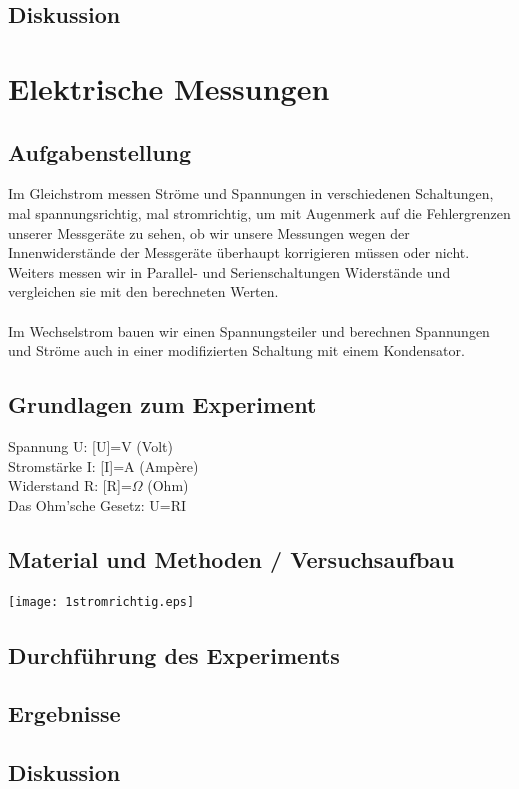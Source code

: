 \documentclass{article}
\begin{document}
\subsection{Diskussion}

\section{Elektrische Messungen}
\subsection{Aufgabenstellung}
Im Gleichstrom messen Ströme und Spannungen in verschiedenen Schaltungen, mal spannungsrichtig, mal stromrichtig, um mit Augenmerk auf die Fehlergrenzen unserer Messgeräte zu sehen, ob wir unsere Messungen wegen der Innenwiderstände der Messgeräte überhaupt korrigieren müssen oder nicht.\\
Weiters messen wir in Parallel- und Serienschaltungen Widerstände und vergleichen sie mit den berechneten Werten.\\
\\
Im Wechselstrom bauen wir einen Spannungsteiler und berechnen Spannungen und Ströme auch in einer modifizierten Schaltung mit einem Kondensator.

\subsection{Grundlagen zum Experiment}
Spannung U: [U]=V (Volt)\\
Stromstärke I: [I]=A (Ampère)\\
Widerstand R: [R]=$\Omega$ (Ohm)\\

Das Ohm'sche Gesetz: U=RI

\subsection{Material und Methoden / Versuchsaufbau}
\texttt{[image: 1stromrichtig.eps]}

\subsection{Durchführung des Experiments}

\subsection{Ergebnisse}

\subsection{Diskussion}
\end{document}
